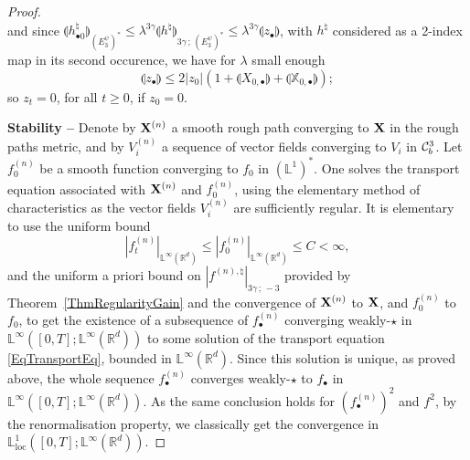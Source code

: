 \documentclass[11pt,a4paper]{amsart}
\newcommand{\RR}{\mathbb{R}}  \newcommand{\CC}{\mathbb{C}}  \newcommand{\LL}{\mathbb{L}}  \newcommand{\WW}{\mathbb{W}}
\renewcommand{\leq}{\leqslant}
\theoremstyle{plain}%
\theoremstyle{definition}
\theoremstyle{remark}
\numberwithin{equation}{section} %
\begin{document}
\begin{proof}
$$$$
and since $  \llparenthesis h^\natural_{\bullet 0} \rrparenthesis_{(E_3^\psi)^*} \leq \lambda^{3\gamma} \llparenthesis h^\natural \rrparenthesis_{3\gamma\,;\,(E_3^\psi)^*} \leq \lambda^{3\gamma}  \llparenthesis z_\bullet \rrparenthesis$, with $h^\natural$ considered as a 2-index map in its second occurence, we have for $\lambda$ small enough
\begin{equation}
\label{EqGronwall}
\llparenthesis z_\bullet \rrparenthesis \leq 2 |z_0| (1+ \llparenthesis X_{0, \bullet} \rrparenthesis+ \llparenthesis \mathbb{X}_{0, \bullet} \rrparenthesis);
\end{equation}
so $z_t = 0$, for all $t\ge 0$, if $z_0 = 0$.

\bigskip
  
{\bf Stability --} Denote by ${{\bf X}}^{(n)}$ a smooth rough path converging to ${\bf X}$ in the rough paths metric, and by $V^{(n)}_i$ a sequence of vector fields converging to $V_i$ in $\mathcal{C}^3_b$. Let $f^{(n)}_0$ be a smooth function converging to $f_0$ in $(\LL^1)^*$. One solves the transport equation associated with ${{\bf X}}^{(n)}$ and $f^{(n)}_0$, using the elementary method of characteristics as the vector fields $V^{(n)}_i$ are sufficiently regular. It is elementary to use the uniform bound
$$
\left|f^{(n)}_t\right|_{\LL^\infty(\RR^d)} \leq \left|f^{(n)}_0\right|_{\LL^\infty(\RR^d)} \leq C<\infty,
$$ 
and the uniform a priori bound on $|f^{(n),\natural}|_{3\gamma\,;\,-3}$ provided by Theorem~\ref{ThmRegularityGain} and the convergence of ${{\bf X}}^{(n)}$ to ${\bf X}$, and $f^{(n)}_0$ to $f_0$, to get the existence of a subsequence of $f^{(n)}_\bullet$ converging weakly-$\star$ in $\LL^\infty([0,T];\LL^\infty(\RR^d))$ to some solution of the transport equation \eqref{EqTransportEq}, bounded in $\LL^\infty(\RR^d)$. Since this solution is unique, as proved above, the whole sequence $f^{(n)}_\bullet$ converges weakly-$\star$ to $f_\bullet$ in $\LL^\infty([0,T];\LL^\infty(\RR^d))$. As the same conclusion holds for $(f^{(n)}_\bullet)^2$ and $f^2$, by the renormalisation property, we classically get the convergence in $\LL^1_\textrm{loc}([0,T];\LL^\infty(\RR^d))$.
\end{proof}

\bigskip
\end{document}
